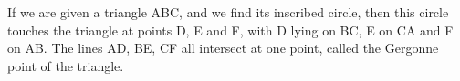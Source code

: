 If we are given a triangle ABC, and we find its inscribed circle, then this circle
touches the triangle at points D, E and F, with D lying on BC, E on CA and F on 
AB. The lines AD, BE, CF all intersect at one point, called the Gergonne point of the
triangle.